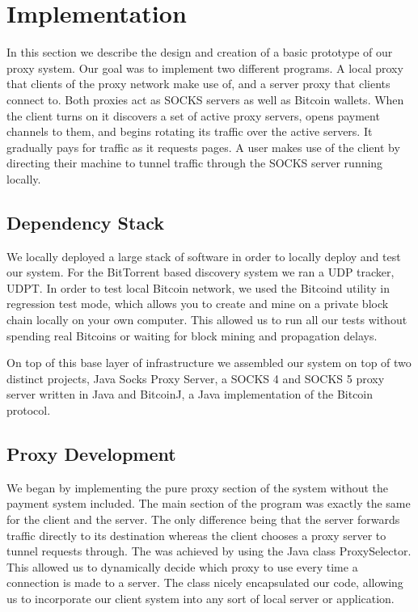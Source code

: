 \section{Implementation}
\label{sec:eval}

In this section we describe the design and creation of a basic prototype of our proxy system. Our goal was to implement two different programs. A local proxy that clients of the proxy network make use of, and a server proxy that clients connect to. Both proxies act as SOCKS servers as well as Bitcoin wallets. When the client turns on it discovers a set of active proxy servers, opens payment channels to them, and begins rotating its traffic over the active servers. It gradually pays for traffic as it requests pages. A user makes use of the client by directing their machine to tunnel traffic through the SOCKS server running locally.

\subsection{Dependency Stack}
We locally deployed a large stack of software in order to locally deploy and test our system. For the BitTorrent based discovery system we ran a UDP tracker, UDPT. In order to test local Bitcoin network, we used the Bitcoind utility in regression test mode, which allows you to create and mine on a private block chain locally on your own computer. This allowed us to run all our tests without spending real Bitcoins or waiting for block mining and propagation delays. 

On top of this base layer of infrastructure we assembled our system on top of two distinct projects, Java Socks Proxy Server, a SOCKS 4 and SOCKS 5 proxy server written in Java and BitcoinJ, a Java implementation of the Bitcoin protocol.

\subsection{Proxy Development}
We began by implementing the pure proxy section of the system without the payment system included. The main section of the program was exactly the same for the client and the server. The only difference being that the server forwards traffic directly to its destination whereas the client chooses a proxy server to tunnel requests through. The was achieved by using the Java class ProxySelector. This allowed us to dynamically decide which proxy to use every time a connection is made to a server. The class nicely encapsulated our code, allowing us to incorporate our client system into any sort of local server or application.

